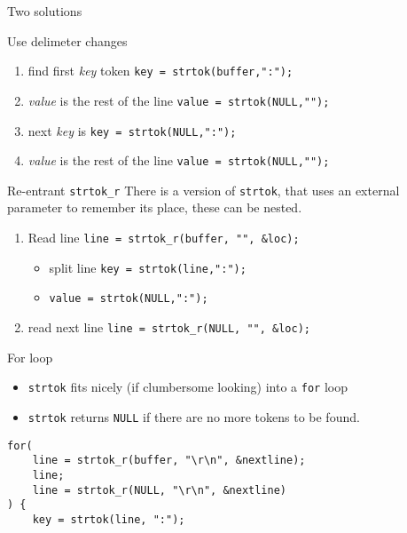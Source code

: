\documentclass[xcolor=svgnames]{beamer}
\begin{document}
\begin{frame}[fragile]{Two solutions }
\begin{block}{Use delimeter changes}
    \begin{enumerate}
        \item find first \emph{key} token \hfill\texttt{key = strtok(buffer,":");}
        \item \emph{value} is the rest of the line
        \hfill\texttt{value = strtok(NULL,"\n ");}
        \item next \emph{key} is
        \hfill\texttt{key = strtok(NULL,":");}
        \item \emph{value} is the rest of the line
        \hfill\texttt{value = strtok(NULL,"\n ");}
    \end{enumerate}
\end{block}

\begin{exampleblock}{Re-entrant \texttt{strtok_r}}
There is a version of \texttt{strtok}, that uses an external parameter to remember its place, these can be nested.

\begin{enumerate}
    \item Read line \hfill\texttt{line = strtok_r(buffer, "\n", &loc);}
    \begin{itemize}
        \item split line \hfill\texttt{key = strtok(line,":");}
        \item  \hfill\texttt{value = strtok(NULL,":");}
    \end{itemize}
    \item read next line
        \hfill\texttt{line = strtok_r(NULL, "\n", &loc);}
\end{enumerate}
\end{exampleblock}
\end{frame}

\begin{frame}[fragile]{For loop}
\begin{itemize}
    \item \texttt{strtok} fits nicely (if clumbersome looking) into a \texttt{for} loop
    \item  \texttt{strtok} returns \texttt{NULL} if there are no more tokens to be found.
\end{itemize}

\begin{exampleblock}{}
\begin{verbatim}
for(
    line = strtok_r(buffer, "\r\n", &nextline);
    line;
    line = strtok_r(NULL, "\r\n", &nextline)
) {
    key = strtok(line, ":");
\end{verbatim}
\end{exampleblock}
\end{frame}
\end{document}
